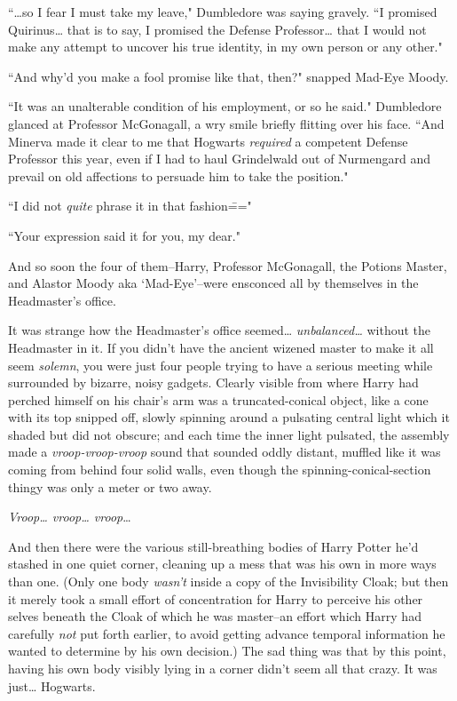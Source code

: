 
``{\ldots}so I fear I must take my leave," Dumbledore was saying gravely. ``I promised Quirinus{\ldots} that is to say, I promised the Defense Professor{\ldots} that I would not make any attempt to uncover his true identity, in my own person or any other."

``And why'd you make a fool promise like that, then?" snapped Mad-Eye Moody.

``It was an unalterable condition of his employment, or so he said." Dumbledore glanced at Professor McGonagall, a wry smile briefly flitting over his face. ``And Minerva made it clear to me that Hogwarts \emph{required} a competent Defense Professor this year, even if I had to haul Grindelwald out of Nurmengard and prevail on old affections to persuade him to take the position."

``I did not \emph{quite} phrase it in that fashion\==="

``Your expression said it for you, my dear."

And so soon the four of them\---Harry, Professor McGonagall, the Potions Master, and Alastor Moody aka `Mad-Eye'\---were ensconced all by themselves in the Headmaster's office.

It was strange how the Headmaster's office seemed{\ldots} \emph{unbalanced{\ldots}} without the Headmaster in it. If you didn't have the ancient wizened master to make it all seem \emph{solemn}, you were just four people trying to have a serious meeting while surrounded by bizarre, noisy gadgets. Clearly visible from where Harry had perched himself on his chair's arm was a truncated-conical object, like a cone with its top snipped off, slowly spinning around a pulsating central light which it shaded but did not obscure; and each time the inner light pulsated, the assembly made a \emph{vroop-vroop-vroop} sound that sounded oddly distant, muffled like it was coming from behind four solid walls, even though the spinning-conical-section thingy was only a meter or two away.

\emph{Vroop{\ldots} vroop{\ldots} vroop}{\ldots}

And then there were the various still-breathing bodies of Harry Potter he'd stashed in one quiet corner, cleaning up a mess that was his own in more ways than one. (Only one body \emph{wasn't} inside a copy of the Invisibility Cloak; but then it merely took a small effort of concentration for Harry to perceive his other selves beneath the Cloak of which he was master\---an effort which Harry had carefully \emph{not} put forth earlier, to avoid getting advance temporal information he wanted to determine by his own decision.) The sad thing was that by this point, having his own body visibly lying in a corner didn't seem all that crazy. It was just{\ldots} Hogwarts.

